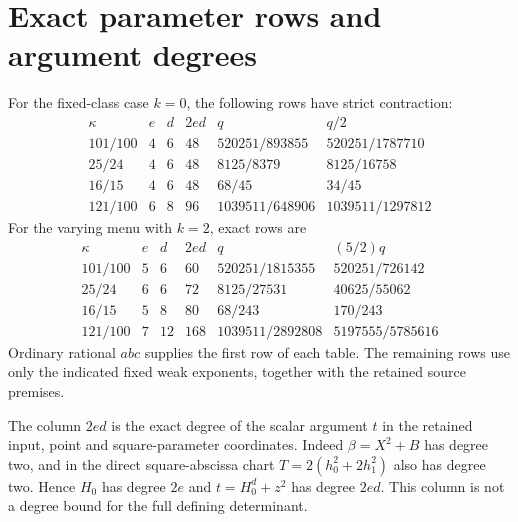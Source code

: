 \documentclass[11pt,a4paper]{article}
\begin{document}
\section{Exact parameter rows and argument degrees}

For the fixed-class case $k=0$, the following rows have strict
contraction:
\[
\begin{array}{c|c|c|c|c|c}
\kappa&e&d&2ed&q&q/2\\\hline
101/100&4&6&48&520251/893855&520251/1787710\\
25/24&4&6&48&8125/8379&8125/16758\\
16/15&4&6&48&68/45&34/45\\
121/100&6&8&96&1039511/648906&1039511/1297812
\end{array}
\]
For the varying menu with $k=2$, exact rows are
\[
\begin{array}{c|c|c|c|c|c}
\kappa&e&d&2ed&q&(5/2)q\\\hline
101/100&5&6&60&520251/1815355&520251/726142\\
25/24&6&6&72&8125/27531&40625/55062\\
16/15&5&8&80&68/243&170/243\\
121/100&7&12&168&1039511/2892808&5197555/5785616
\end{array}
\]
Ordinary rational $abc$ supplies the first row of each table.
The remaining rows use only the indicated fixed weak exponents,
together with the retained source premises.

The column $2ed$ is the exact degree of the scalar argument $t$ in
the retained input, point and square-parameter coordinates. Indeed
$\beta=X^2+B$ has degree two, and in the direct square-abscissa
chart $T=2(h_0^2+2h_1^2)$ also has degree two. Hence $H_0$ has
degree $2e$ and $t=H_0^d+z^2$ has degree $2ed$. This column is
not a degree bound for the full defining determinant.
\end{document}
